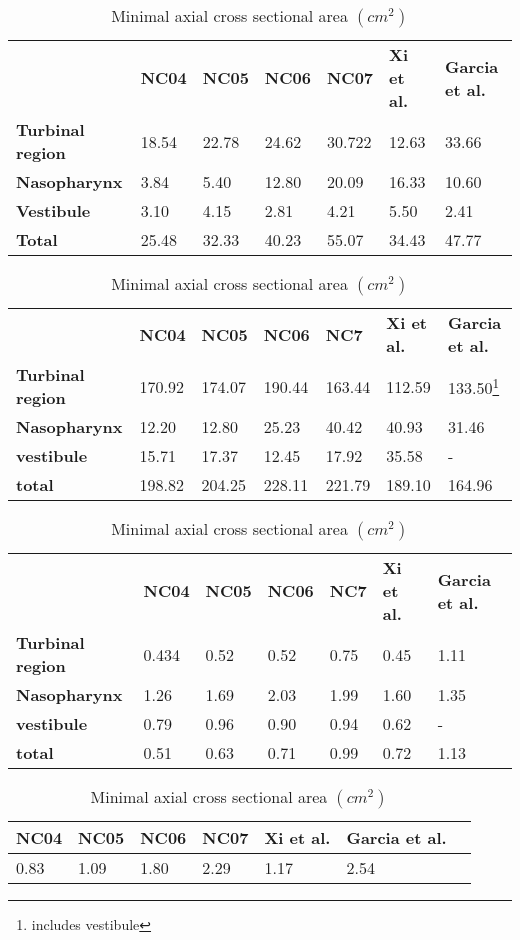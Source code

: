 \documentclass{report}
\begin{document}
\begin{table}[geometric comparison]
\begin{tabular}{lllllll}
 & \textbf{NC04} & \textbf{NC05} & \textbf{NC06} & \textbf{NC07} & \textbf{Xi et al.\cite{Xi2012}} & \textbf{Garcia et al.\cite{Garcia2007}} \\
\cline{2-7}
\textbf{Turbinal region} & 18.54 & 22.78 & 24.62& 30.722& 12.63& 33.66\\
\textbf{Nasopharynx}  & 3.84 & 5.40 & 12.80 & 20.09 & 16.33 & 10.60\\
\textbf{Vestibule} & 3.10 & 4.15 & 2.81 & 4.21 & 5.50 & 2.41\\
\textbf{Total} & 25.48 & 32.33 & 40.23 & 55.07 & 34.43 & 47.77 \\
\hline
\end{tabular}
\caption{ sectional volume, according to sections as seen in Figure \ref{fig:regions} ($ cm^3 $)}\label{tab:secvol}
\begin{tabular}{lllllll}
 & \textbf{NC04} & \textbf{NC05} & \textbf{NC06} & \textbf{NC7} & \textbf{Xi et al.\cite{Xi2012}} & \textbf{Garcia et al.\cite{Garcia2007}}\\
 \cline{2-7}
\textbf{Turbinal region} & 170.92 & 174.07& 190.44 & 163.44 & 112.59 & 133.50\footnote{includes vestibule} \\
\textbf{Nasopharynx} & 12.20 & 12.80 & 25.23 & 40.42 & 40.93 & 31.46\\
\textbf{vestibule} & 15.71 & 17.37 & 12.45 & 17.92 & 35.58 &  -\\
\textbf{total} & 198.82 & 204.25 & 228.11 & 221.79 & 189.10 & 164.96\\
\hline
\end{tabular}
\caption{sectional surface area, according to sections shown in Figure \ref{fig:regions}($ cm^2 $)}\label{tab:secsa}
\begin{tabular}{lllllll}
& \textbf{NC04}  & \textbf{NC05} & \textbf{NC06} & \textbf{NC7} & \textbf{Xi et al.\cite{Xi2012}} & \textbf{Garcia et al.\cite{Garcia2007}}\\
 \cline{2-7}
\textbf{Turbinal region} & 0.434 & 0.52 & 0.52 & 0.75 & 0.45 & 1.11\\
\textbf{Nasopharynx} & 1.26 & 1.69 & 2.03 & 1.99 & 1.60 & 1.35\\
\textbf{vestibule} & 0.79 & 0.96 & 0.90 & 0.94 & 0.62 &  - \\
\textbf{total} & 0.51 & 0.63 & 0.71 & 0.99 & 0.72 & 1.13 \\
\hline
\end{tabular}
\caption{Effective diameter $d_{eff} = \frac{4v}{a} (cm) $}\label{tab:deff}
\begin{tabular}{lllllll}
\textbf{NC04}& \textbf{NC05}& \textbf{NC06}&\textbf{ NC07}& \textbf{Xi et al.\cite{Xi2012}}& \textbf{Garcia et al.\cite{Garcia2007}}\\
\hline
0.83& 1.09& 1.80& 2.29& 1.17& 2.54
\end{tabular}
\caption{Minimal axial cross sectional area $(cm^2)$}\label{tab:mca}
\end{table}
\end{document}
